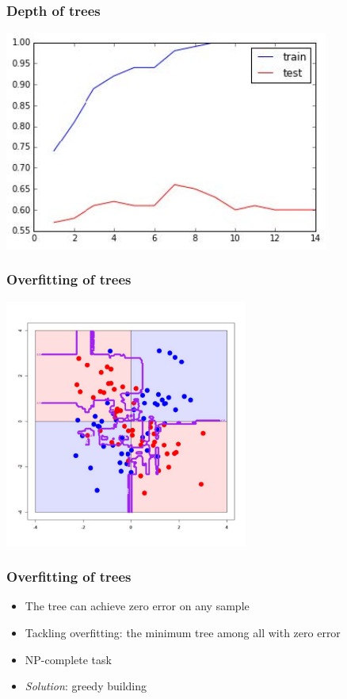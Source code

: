 \documentclass[default]{beamer}
\begin{document}
	\begin{frame}
		\frametitle{Depth of trees}
		\centering
		\includegraphics[width=0.8\textwidth]{trees11.jpg}
	\end{frame}

	\begin{frame}
		\frametitle{Overfitting of trees}
		\centering
		\includegraphics[width=0.6\textwidth]{trees12.jpg}
	\end{frame}

	\begin{frame}
		\frametitle{Overfitting of trees}
		
		\Large
		\begin{itemize}
			\item The tree can achieve zero error on any sample
			\item Tackling overfitting: the minimum tree among all with zero error
			\item NP-complete task
			\par\bigskip
			\item \textit{Solution}: greedy building
		\end{itemize}
	\end{frame}
\end{document}
